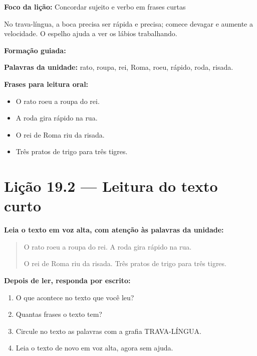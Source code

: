 \textbf{Foco da lição:} Concordar sujeito e verbo em frases curtas


\begin{boquinha}
No trava-língua, a boca precisa ser rápida e precisa; comece devagar e aumente a velocidade. O espelho ajuda a ver os lábios trabalhando.
\end{boquinha}

\noindent\textbf{Formação guiada:}

\begin{center}
\end{center}

\noindent\textbf{Palavras da unidade:} rato, roupa, rei, Roma, roeu, rápido, roda, risada.

\noindent\textbf{Frases para leitura oral:}
\begin{itemize}[leftmargin=1.6em]
  \item O rato roeu a roupa do rei.
  \item A roda gira rápido na rua.
  \item O rei de Roma riu da risada.
  \item Três pratos de trigo para três tigres.
\end{itemize}

\section{Lição 19.2 --- Leitura do texto curto}

\noindent\textbf{Leia o texto em voz alta, com atenção às palavras da unidade:}


\begin{quote}
O rato roeu a roupa do rei. A roda gira rápido na rua.

O rei de Roma riu da risada. Três pratos de trigo para três tigres.
\end{quote}

\textbf{Depois de ler, responda por escrito:}
\begin{enumerate}

  \item O que acontece no texto que você leu?
  \begin{center}
  \underline{\hspace{12cm}}
  \end{center}

  \item Quantas frases o texto tem?
  \begin{center}
  \underline{\hspace{12cm}}
  \end{center}

  \item Circule no texto as palavras com a grafia TRAVA-LÍNGUA.

  \item Leia o texto de novo em voz alta, agora sem ajuda.

\end{enumerate}

